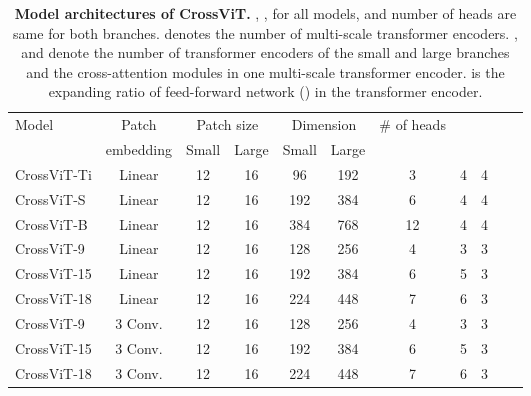 \documentclass[10pt,twocolumn,letterpaper]{article}
\def\ours{CrossViT\xspace}
\begin{document}
\begin{table}[t]
    \centering
    \begin{adjustbox}{max width=\linewidth}
    \begin{tabular}{l|cccccccccc}
        \toprule
Model & Patch  & \multicolumn{2}{c}{Patch size} & \multicolumn{2}{c}{Dimension} & \# of heads &  &  \\
                      & embedding & Small & Large & Small & Large &  \\
        \midrule
        \ours-Ti & Linear & 12 & 16 & 96& 192 & 3 & 4 & 4  \\
        \ours-S & Linear & 12 & 16 & 192& 384 & 6 & 4 & 4  \\
        \ours-B & Linear & 12 & 16 & 384& 768 & 12 & 4 & 4  \\
        \ours-9 & Linear & 12 & 16 & 128& 256 & 4 & 3 & 3  \\
        \ours-15 & Linear & 12 & 16 & 192& 384 & 6 & 5 & 3  \\
        \ours-18 & Linear & 12 & 16 & 224& 448 & 7 & 6 & 3  \\
        \ours-9 & 3 Conv. & 12 & 16 & 128& 256 & 4 & 3 & 3  \\
        \ours-15 & 3 Conv. & 12 & 16 & 192& 384 & 6 & 5 & 3  \\
        \ours-18 & 3 Conv. & 12 & 16 & 224& 448 & 7 & 6 & 3  \\
\bottomrule
    \end{tabular}
    \end{adjustbox}
\caption{\textbf{Model architectures of \ours.} , ,  for all models, and number of heads are same for both branches.
     denotes the number of multi-scale transformer encoders. ,  and  denote the number of transformer encoders of the small and large branches and the cross-attention modules in one multi-scale transformer encoder.  is the expanding ratio of feed-forward network () in the transformer encoder.}
\label{table:models}
\end{table}
\end{document}
